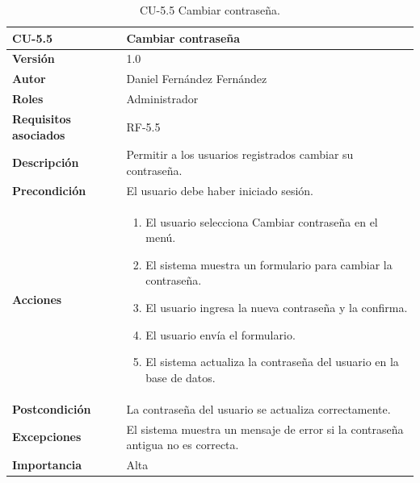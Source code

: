 \begin{table}[p]
        \centering
        \begin{tabularx}{\linewidth}{ p{} p{} }
            \toprule
            \textbf{CU-5.5} & \textbf{Cambiar contraseña}\\
            \toprule
            \textbf{Versión} & 1.0 \\
            \textbf{Autor} & Daniel Fernández Fernández \\
            \textbf{Roles} & Administrador \\
            \textbf{Requisitos asociados} & RF-5.5 \\
            \textbf{Descripción} & Permitir a los usuarios registrados cambiar su contraseña. \\
            \textbf{Precondición} & El usuario debe haber iniciado sesión. \\
            \textbf{Acciones} &
            \begin{enumerate}
            \def\labelenumi{\arabic{enumi}.}
            \tightlist
            \item El usuario selecciona Cambiar contraseña en el menú.
            \item El sistema muestra un formulario para cambiar la contraseña.
            \item El usuario ingresa la nueva contraseña y la confirma.
            \item El usuario envía el formulario.
            \item El sistema actualiza la contraseña del usuario en la base de datos.
            \end{enumerate}\\
            \textbf{Postcondición} & La contraseña del usuario se actualiza correctamente. \\
            \textbf{Excepciones} & El sistema muestra un mensaje de error si la contraseña antigua no es correcta. \\
            \textbf{Importancia} & Alta \\
            \bottomrule
        \end{tabularx}
        \caption{CU-5.5 Cambiar contraseña.}
\end{table}

